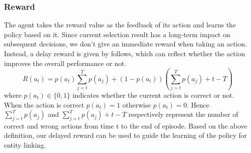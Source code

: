 \documentclass[sigconf]{acmart}
\begin{document}
\subsubsection*{Reward}
The agent takes the reward value as the feedback of its action and learns the policy based on it. Since current selection result has a long-term impact on subsequent decisions, we don't give an immediate reward when taking an action. Instead, a delay reward is given by follows, which can reflect whether the action improves the overall performance or not.
\begin{equation}       
R(a_t) = p(a_t)\sum_{j=t}^{T}p(a_j) + (1 - p(a_t))(\sum_{j=t}^{T}p(a_j) + t - T)
\end{equation}
where $p(a_t)\in\{0,1\}$ indicates whether the current action is correct or not. When the action is correct $p(a_t)=1$ otherwise $p(a_t)=0$. Hence $\sum_{j=t}^{T}p(a_j)$ and $\sum_{j=t}^{T}p(a_j) + t - T$ respectively represent the number of correct and wrong actions from time t to the end of episode. Based on the above definition, our delayed reward can be used to guide the learning of the policy for entity linking.
\end{document}
